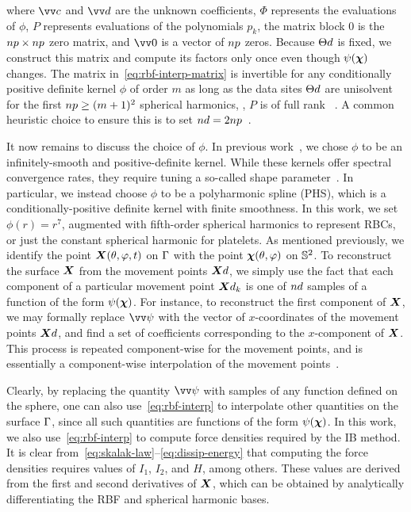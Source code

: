 where $\arr{c}$ and $\arr{d}$ are the unknown coefficients, $\Phi$ represents the evaluations of $\phi$, $P$
represents evaluations of the polynomials $p_k$, the matrix block $0$ is the
$\poly\cardinality\times\poly\cardinality$ zero matrix, and $\arr{0}$ is a vector of $\poly\cardinality$ zeros.
Because $\data\sites$ is fixed, we construct this matrix and compute its factors only once even though $\psi(\boldsymbol{\chi})$
changes. The matrix in~\eqref{eq:rbf-interp-matrix} is invertible for any conditionally positive definite kernel
$\phi$ of order $m$ as long as the data sites $\data\sites$ are unisolvent for the first
$\poly\cardinality \ge (m+1)^2$ spherical harmonics, , $P$ is of full rank~ \cite{Fasshauer:2007ui}. A
common heuristic choice to ensure this is to set $\data\cardinality = 2 \poly\cardinality$~\cite{SWJCP2018}.

It now remains to discuss the choice of $\phi$. In previous work~\cite{Shankar:2015km}, we chose $\phi$ to be an
infinitely-smooth and positive-definite kernel. While these kernels offer spectral convergence rates, they require
tuning a so-called shape parameter~\cite{Fasshauer:2007ui}. In particular, we instead choose $\phi$ to be a
polyharmonic spline (PHS), which is a conditionally-positive definite kernel with finite smoothness. In this work,
we set $\phi(r) = r^7$, augmented with fifth-order spherical harmonics to represent RBCs, or just the constant
spherical harmonic for platelets. As mentioned previously, we identify the point $\boldsymbol{X}(\theta, \varphi, t)$ on
$\Gamma$ with the point $\boldsymbol{\chi}(\theta, \varphi)$ on $\mathbb{S}^2$.  To reconstruct the surface $\boldsymbol{X}$ from the
movement points $\data\X$, we simply use the fact that each component of a particular movement point $\data\X_k$
is one of $\data\cardinality$ samples of a function of the form $\psi(\boldsymbol{\chi})$. For instance, to reconstruct the
first component of $\boldsymbol{X}$, we may formally replace $\arr{\psi}$ with the vector of $x$-coordinates of the movement
points $\data\X$, and find a set of coefficients corresponding to the $x$-component of $\boldsymbol{X}$.  This process is
repeated component-wise for the movement points, and is essentially a component-wise interpolation of the movement
points~\cite{Shankar:2015km}.

Clearly, by replacing the quantity $\arr{\psi}$ with samples of any function defined on the sphere, one can also
use~\eqref{eq:rbf-interp} to interpolate other quantities on the surface $\Gamma$, since all such quantities
are functions of the form $\psi(\boldsymbol{\chi})$. In this work, we also use~\eqref{eq:rbf-interp} to compute force densities
required by the IB method. It is clear from~\eqref{eq:skalak-law}--\eqref{eq:dissip-energy} that computing the
force densities requires values of $I_1$, $I_2$, and $H$, among others.  These values are derived from the first
and second derivatives of $\boldsymbol{X}$, which can be obtained by analytically differentiating the RBF and spherical
harmonic bases.

